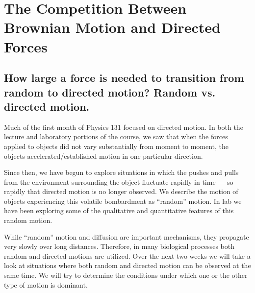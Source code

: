 \chapter{The Competition Between Brownian Motion and Directed Forces}
\thispagestyle{fancy}
\section{How large a force is needed to transition from random to directed motion? Random vs. directed motion.}
Much of the first month of Physics 131 focused on directed motion. In both the lecture and laboratory portions of the course, we saw that when the forces applied to objects did not vary substantially from moment to moment, the objects accelerated/established motion in one particular direction.
\par
Since then, we have begun to explore situations in which the pushes and pulls from the environment surrounding the object fluctuate rapidly in time — so rapidly that directed motion is no longer observed. 
We describe the motion of objects experiencing this volatile bombardment as ``random'' motion. 
In lab we have been exploring some of the qualitative and quantitative features of this random motion.
\par
While ``random'' motion and diffusion are important mechanisms, they propagate very slowly over long distances. 
Therefore, in many biological processes both random and directed motions are utilized. 
Over the next two weeks we will take a look at situations where both random and directed motion can be observed at the same time. 
We will try to determine the conditions under which one or the other type of motion is dominant.
